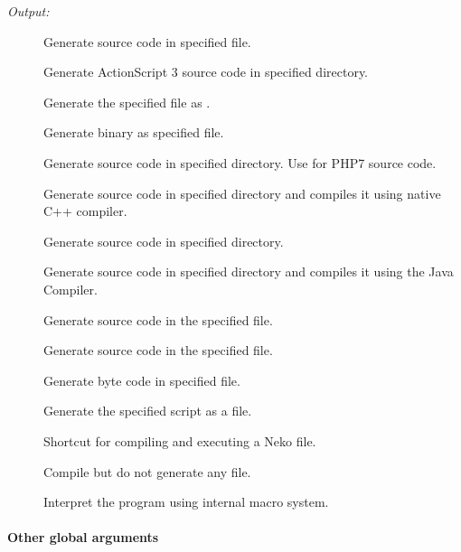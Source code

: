 \emph{Output:}

\begin{description}
	\item[] Generate  source code in specified file.
	\item[] Generate ActionScript 3 source code in specified directory.
	\item[] Generate the specified file as  .
	\item[] Generate  binary as specified file.
	\item[] Generate  source code in specified directory. Use  for PHP7 source code.
	\item[] Generate  source code in specified directory and compiles it using native C++ compiler.
	\item[] Generate  source code in specified directory.
	\item[] Generate  source code in specified directory and compiles it using the Java Compiler.
	\item[] Generate  source code in the specified file.
	\item[] Generate  source code in the specified file.
	\item[] Generate  byte code in specified file.
	\item[] Generate the specified script as a  file.
	\item[] Shortcut for compiling and executing a Neko file.
	\item[] Compile but do not generate any file.
	\item[] Interpret the program using internal macro system.
\end{description}

\paragraph{Other global arguments}

